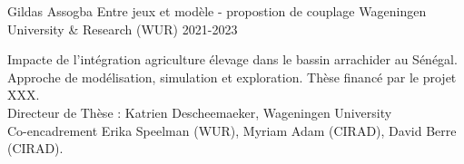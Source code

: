 \begin{cventries}
    \cventry
      {Gildas Assogba} %
      {Entre jeux et modèle - propostion de couplage} %
      {Wageningen University \& Research (WUR)} %
      {2021-2023} %
      {
        \begin{cvitems} %
         Impacte de l'intégration agriculture élevage dans le bassin arrachider au Sénégal. Approche de modélisation, simulation et exploration. Thèse financé par le projet XXX.\\
         Directeur de Thèse : Katrien Descheemaeker, Wageningen University\\
         Co-encadrement Erika Speelman (WUR), Myriam Adam (CIRAD), David Berre (CIRAD).
        \end{cvitems}
      }  
\end{cventries}

